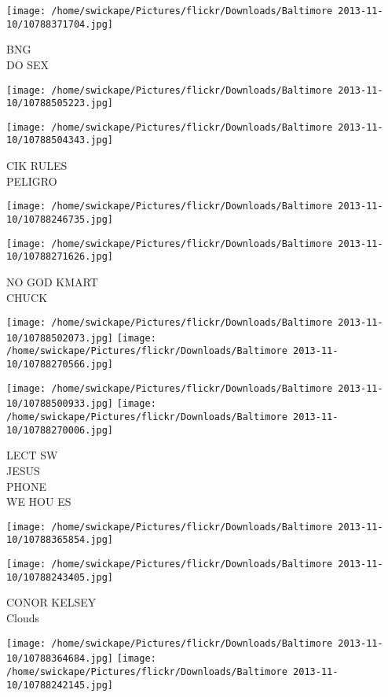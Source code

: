 \documentclass[10pt,letterpaper]{article}
\begin{document}
\vspace{0.25in}
\texttt{[image: /home/swickape/Pictures/flickr/Downloads/Baltimore 2013-11-10/10788371704.jpg]}

BNG\\
DO SEX
\pagebreak

\texttt{[image: /home/swickape/Pictures/flickr/Downloads/Baltimore 2013-11-10/10788505223.jpg]}

\vspace{0.25in}
\texttt{[image: /home/swickape/Pictures/flickr/Downloads/Baltimore 2013-11-10/10788504343.jpg]}

CIK RULES\\
PELIGRO
\pagebreak

\texttt{[image: /home/swickape/Pictures/flickr/Downloads/Baltimore 2013-11-10/10788246735.jpg]}

\vspace{0.25in}
\texttt{[image: /home/swickape/Pictures/flickr/Downloads/Baltimore 2013-11-10/10788271626.jpg]}

NO GOD KMART\\
CHUCK
\pagebreak

\texttt{[image: /home/swickape/Pictures/flickr/Downloads/Baltimore 2013-11-10/10788502073.jpg]}
\texttt{[image: /home/swickape/Pictures/flickr/Downloads/Baltimore 2013-11-10/10788270566.jpg]}

\texttt{[image: /home/swickape/Pictures/flickr/Downloads/Baltimore 2013-11-10/10788500933.jpg]}
\texttt{[image: /home/swickape/Pictures/flickr/Downloads/Baltimore 2013-11-10/10788270006.jpg]}

LECT SW\\
JESUS\\
PHONE\\
WE HOU ES
\pagebreak

\texttt{[image: /home/swickape/Pictures/flickr/Downloads/Baltimore 2013-11-10/10788365854.jpg]}

\vspace{0.25in}
\texttt{[image: /home/swickape/Pictures/flickr/Downloads/Baltimore 2013-11-10/10788243405.jpg]}

CONOR KELSEY\\
Clouds
\pagebreak

\texttt{[image: /home/swickape/Pictures/flickr/Downloads/Baltimore 2013-11-10/10788364684.jpg]}
\texttt{[image: /home/swickape/Pictures/flickr/Downloads/Baltimore 2013-11-10/10788242145.jpg]}
\end{document}
